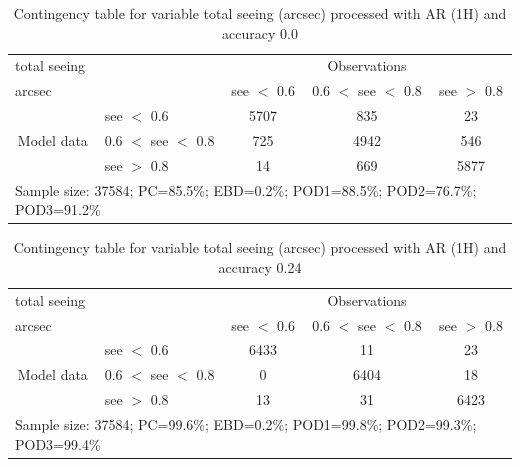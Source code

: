 \documentclass[a4paper,english]{article}
\begin{document}
\begin{table}[]
\begin{center}
\begin{tabular}{llccc}
\hline
{total seeing}                                       &                                                    & \multicolumn{3}{c}{Observations}                 \\
{arcsec}                                       &                             & see $<$ 0.6   & 0.6 $<$ see $<$ 0.8 & see $>$ 0.8 \\
\hline
\multicolumn{1}{c}{\multirow{3}{*}{Model data}}  & see $<$ 0.6             & 5707                & 835                       & 23              \\
                                                 & 0.6  $<$ see $<$ 0.8 & 725                & 4942                       & 546              \\
                                                 & see $>$ 0.8             & 14                & 669                       & 5877              \\
\hline
\multicolumn{5}{l}{Sample size: 37584; PC=85.5\%; EBD=0.2\%; POD1=88.5\%; POD2=76.7\%; POD3=91.2\%}
\end{tabular}
\end{center}
\caption{Contingency table for variable total seeing (arcsec) processed with AR (1H) and accuracy 0.0}
\label{tab:contingencyseeAFT}
\end{table}
\begin{table}[]
\begin{center}
\begin{tabular}{llccc}
\hline
{total seeing}                                       &                                                    & \multicolumn{3}{c}{Observations}                 \\
{arcsec}                                       &                             & see $<$ 0.6   & 0.6 $<$ see $<$ 0.8 & see $>$ 0.8 \\
\hline
\multicolumn{1}{c}{\multirow{3}{*}{Model data}}  & see $<$ 0.6             & 6433                & 11                       & 23              \\
                                                 & 0.6  $<$ see $<$ 0.8 & 0                & 6404                       & 18              \\
                                                 & see $>$ 0.8             & 13                & 31                       & 6423              \\
\hline
\multicolumn{5}{l}{Sample size: 37584; PC=99.6\%; EBD=0.2\%; POD1=99.8\%; POD2=99.3\%; POD3=99.4\%}
\end{tabular}
\end{center}
\caption{Contingency table for variable total seeing (arcsec) processed with AR (1H) and accuracy 0.24}
\label{tab:contingencyseeAFT}
\end{table}
\end{document}
